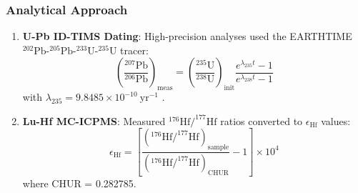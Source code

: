 \documentclass{article}
\begin{document}
\subsubsection*{Analytical Approach}
\begin{enumerate}
    \item \textbf{U-Pb ID-TIMS Dating}:  
    High-precision analyses used the EARTHTIME \(^{202}\text{Pb}\)-\(^{205}\text{Pb}\)-\(^{233}\text{U}\)-\(^{235}\text{U}\) tracer:
    \begin{equation}
        \left(\frac{^{207}\text{Pb}}{^{206}\text{Pb}}\right)_{\text{meas}} = \left(\frac{^{235}\text{U}}{^{238}\text{U}}\right)_{\text{init}} \frac{e^{\lambda_{235}t} - 1}{e^{\lambda_{238}t} - 1}
        \label{eq:pb_pb}
    \end{equation}
    with \(\lambda_{235} = 9.8485 \times 10^{-10}\ \text{yr}^{-1}\) \cite{Jaffey1975}.

    \item \textbf{Lu-Hf MC-ICPMS}:  
    Measured \(^{176}\text{Hf}/^{177}\text{Hf}\) ratios converted to \(\epsilon_{\text{Hf}}\) values:
    \begin{equation}
        \epsilon_{\text{Hf}} = \left[\frac{(^{176}\text{Hf}/^{177}\text{Hf})_{\text{sample}}}{(^{176}\text{Hf}/^{177}\text{Hf})_{\text{CHUR}}} - 1\right] \times 10^4
        \label{eq:ehf}
    \end{equation}
    where CHUR = 0.282785.
\end{enumerate}
\end{document}

